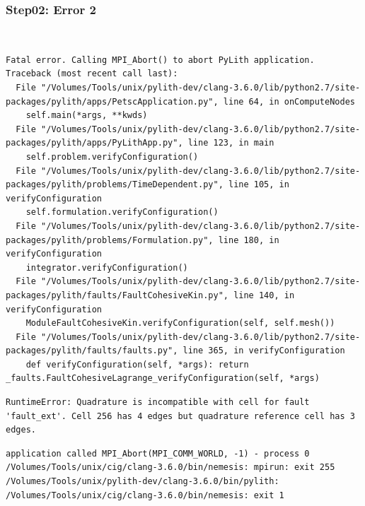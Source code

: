 \documentclass{beamer}
\begin{document}
\begin{frame}[fragile]
  \frametitle{Step02: Error 2}

\\
\begin{lstlisting}
Fatal error. Calling MPI_Abort() to abort PyLith application.
Traceback (most recent call last):
  File "/Volumes/Tools/unix/pylith-dev/clang-3.6.0/lib/python2.7/site-packages/pylith/apps/PetscApplication.py", line 64, in onComputeNodes
    self.main(*args, **kwds)
  File "/Volumes/Tools/unix/pylith-dev/clang-3.6.0/lib/python2.7/site-packages/pylith/apps/PyLithApp.py", line 123, in main
    self.problem.verifyConfiguration()
  File "/Volumes/Tools/unix/pylith-dev/clang-3.6.0/lib/python2.7/site-packages/pylith/problems/TimeDependent.py", line 105, in verifyConfiguration
    self.formulation.verifyConfiguration()
  File "/Volumes/Tools/unix/pylith-dev/clang-3.6.0/lib/python2.7/site-packages/pylith/problems/Formulation.py", line 180, in verifyConfiguration
    integrator.verifyConfiguration()
  File "/Volumes/Tools/unix/pylith-dev/clang-3.6.0/lib/python2.7/site-packages/pylith/faults/FaultCohesiveKin.py", line 140, in verifyConfiguration
    ModuleFaultCohesiveKin.verifyConfiguration(self, self.mesh())
  File "/Volumes/Tools/unix/pylith-dev/clang-3.6.0/lib/python2.7/site-packages/pylith/faults/faults.py", line 365, in verifyConfiguration
    def verifyConfiguration(self, *args): return _faults.FaultCohesiveLagrange_verifyConfiguration(self, *args)
\end{lstlisting}
\begin{lstlisting}
RuntimeError: Quadrature is incompatible with cell for fault 'fault_ext'. Cell 256 has 4 edges but quadrature reference cell has 3 edges.
\end{lstlisting}
\begin{lstlisting}
application called MPI_Abort(MPI_COMM_WORLD, -1) - process 0
/Volumes/Tools/unix/cig/clang-3.6.0/bin/nemesis: mpirun: exit 255
/Volumes/Tools/unix/pylith-dev/clang-3.6.0/bin/pylith: /Volumes/Tools/unix/cig/clang-3.6.0/bin/nemesis: exit 1
\end{lstlisting}
  
\end{frame}
\end{document}
